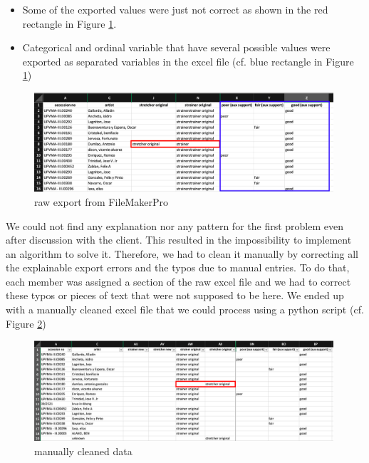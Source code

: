 \documentclass[11pt, oneside]{article}
\begin{document}
\begin{itemize}
    \item Some of the exported values were just not correct as shown in the red rectangle in Figure \ref{FMPexport}.
    \item Categorical and ordinal variable that have several possible values were exported as separated variables in the excel file (cf. blue rectangle in Figure \ref{FMPexport})
\end{itemize}

\begin{figure}[H]
    \centering
    \includegraphics[width=0.99\textwidth]{images/exportFMP.png}
    \caption{raw export from FileMakerPro}
    \label{FMPexport}
\end{figure}

\noindent We could not find any explanation nor any pattern for the first problem even after discussion with the client. This resulted in the impossibility to implement an algorithm to solve it. Therefore, we had to clean it manually by correcting all the explainable export errors and the typos due to manual entries. To do that, each member was assigned a section of the raw excel file and we had to correct these typos or pieces of text that were not supposed to be here. We ended up with a manually cleaned excel file that we could process using a python script (cf. Figure \ref{ManCleanD})

\begin{figure}[H]
    \centering
    \includegraphics[width=0.99\textwidth]{images/ManCleanDSProject.png}
    \caption{manually cleaned data}
    \label{ManCleanD}
\end{figure}
\end{document}
